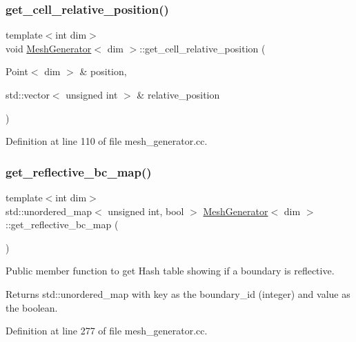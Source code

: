 \subsubsection{\texorpdfstring{get\+\_\+cell\+\_\+relative\+\_\+position()}{get\_cell\_relative\_position()}}
{\footnotesize\ttfamily template$<$int dim$>$ \\
void \hyperlink{class_mesh_generator}{Mesh\+Generator}$<$ dim $>$\+::get\+\_\+cell\+\_\+relative\+\_\+position (\begin{DoxyParamCaption}\item[{Point$<$ dim $>$ \&}]{position,  }\item[{std\+::vector$<$ unsigned int $>$ \&}]{relative\+\_\+position }\end{DoxyParamCaption})\hspace{0.3cm}{\ttfamily [private]}}



Definition at line 110 of file mesh\+\_\+generator.\+cc.

\mbox{\label{class_mesh_generator_a525754e676dca1ed4ffac34f63a5d1ae}} 
\subsubsection{\texorpdfstring{get\+\_\+reflective\+\_\+bc\+\_\+map()}{get\_reflective\_bc\_map()}}
{\footnotesize\ttfamily template$<$int dim$>$ \\
std\+::unordered\+\_\+map$<$ unsigned int, bool $>$ \hyperlink{class_mesh_generator}{Mesh\+Generator}$<$ dim $>$\+::get\+\_\+reflective\+\_\+bc\+\_\+map (\begin{DoxyParamCaption}{ }\end{DoxyParamCaption})}

Public member function to get Hash table showing if a boundary is reflective.

\begin{DoxyReturn}{Returns}
std\+::unordered\+\_\+map with key as the boundary\+\_\+id (integer) and value as the boolean. 
\end{DoxyReturn}


Definition at line 277 of file mesh\+\_\+generator.\+cc.

\mbox{\label{class_mesh_generator_a0c5f845cf8476424892eb7b263672e73}} 
